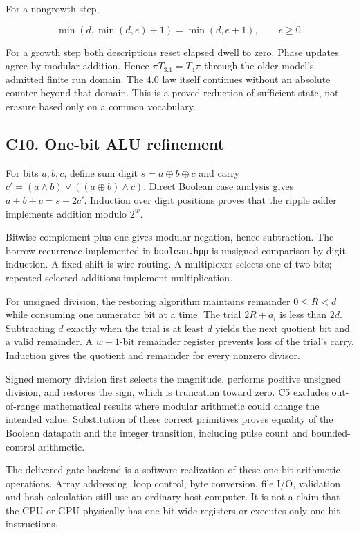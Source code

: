 \documentclass[11pt,a4paper]{article}
\begin{document}
For a nongrowth step,

\[
\min(d,\min(d,e)+1)=\min(d,e+1),\qquad e\ge0.
\]

For a growth step both descriptions reset elapsed dwell to zero. Phase
updates agree by modular addition. Hence \(\pi T_{3.1}=T_4\pi\) through
the older model's admitted finite run domain. The 4.0 law itself
continues without an absolute counter beyond that domain. This is a
proved reduction of sufficient state, not erasure based only on a common
vocabulary.

\subsection{C10. One-bit ALU
refinement}\label{c10.-one-bit-alu-refinement}

For bits \(a,b,c\), define sum digit \(s=a\oplus b\oplus c\) and carry
\(c'=(a\land b)\lor((a\oplus b)\land c)\). Direct Boolean case analysis
gives \(a+b+c=s+2c'\). Induction over digit positions proves that the
ripple adder implements addition modulo \(2^w\).

Bitwise complement plus one gives modular negation, hence subtraction.
The borrow recurrence implemented in \texttt{boolean.hpp} is unsigned
comparison by digit induction. A fixed shift is wire routing. A
multiplexer selects one of two bits; repeated selected additions
implement multiplication.

For unsigned division, the restoring algorithm maintains remainder
\(0\le R<d\) while consuming one numerator bit at a time. The trial
\(2R+a_i\) is less than \(2d\). Subtracting \(d\) exactly when the trial
is at least \(d\) yields the next quotient bit and a valid remainder. A
\(w+1\)-bit remainder register prevents loss of the trial's carry.
Induction gives the quotient and remainder for every nonzero divisor.

Signed memory division first selects the magnitude, performs positive
unsigned division, and restores the sign, which is truncation toward
zero. C5 excludes out-of-range mathematical results where modular
arithmetic could change the intended value. Substitution of these
correct primitives proves equality of the Boolean datapath and the
integer transition, including pulse count and bounded-control
arithmetic.

The delivered gate backend is a software realization of these one-bit
arithmetic operations. Array addressing, loop control, byte conversion,
file I/O, validation and hash calculation still use an ordinary host
computer. It is not a claim that the CPU or GPU physically has
one-bit-wide registers or executes only one-bit instructions.
\end{document}
